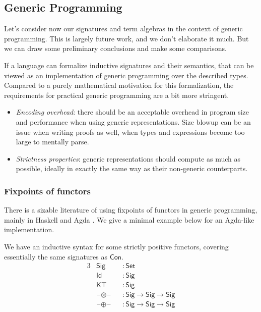 \documentclass[12pt,a4paper,twoside,openany]{book}
\theoremstyle{remark}
\theoremstyle{definition}
\theoremstyle{theorem}
\newcommand{\ms}[1]{\mathsf{#1}}
\newcommand{\Con}{\mathsf{Con}}
\newcommand{\blank}{\mathord{\hspace{1pt}\text{--}\hspace{1pt}}}
\newcommand{\Set}{\mathsf{Set}}
\begin{document}
\subsection{Generic Programming}
\label{sec:generic-programming}

Let's consider now our signatures and term algebras in the context of generic
programming. This is largely future work, and we don't elaborate it much. But we
can draw some preliminary conclusions and make some comparisons.

If a language can formalize inductive signatures and their semantics, that can
be viewed as an implementation of generic programming over the described types.
Compared to a purely mathematical motivation for this formalization, the
requirements for practical generic programming are a bit more stringent.
\begin{itemize}
  \item \emph{Encoding overhead}: there should be an acceptable overhead in
    program size and performance when using generic representations.  Size
    blowup can be an issue when writing proofs as well, when types and
    expressions become too large to mentally parse.
  \item \emph{Strictness properties}: generic representations should compute as
    much as possible, ideally in exactly the same way as their non-generic
    counterparts.
\end{itemize}

\subsubsection{Fixpoints of functors}
There is a sizable literature of using fixpoints of functors in generic
programming, mainly in Haskell \cite{alacarte,compdata,multirec} and Agda
\cite{loh11generic,allais20type}. We give a minimal example below for an
Agda-like implementation.

We have an inductive syntax for some strictly positive functors, covering essentially the
same signatures as $\Con$.
\begin{alignat*}{3}
  & \ms{Sig}                &&: \Set \\
  & \ms{Id}                 &&: \ms{Sig} \\
  & \ms{K\top}              &&: \ms{Sig} \\
  & \blank\!\otimes\!\blank &&: \ms{Sig} \to \ms{Sig} \to \ms{Sig} \\
  & \blank\!\oplus\!\blank  &&: \ms{Sig} \to \ms{Sig} \to \ms{Sig}
\end{alignat*}
\end{document}
